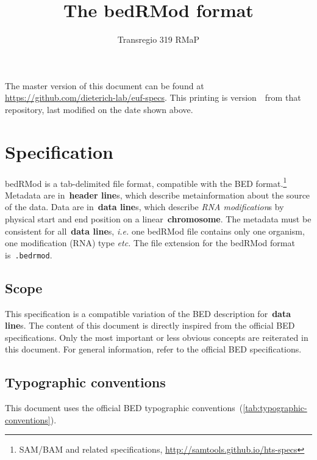 \documentclass[11pt]{article}
\title{The \acf{bedRMod} format}
\author{Transregio 319 RMaP}
\date{\headdate}
\providecommand*{\Ac}[1]{\ac{#1}} %
\begin{document}
\maketitle

\begin{small}
\noindent
The master version of this document can be found at \url{https://github.com/dieterich-lab/euf-specs}.
This printing is version~\commitdesc\ from that repository, last modified on the date shown above.
\end{small}


\section{Specification}

\Ac{bedRMod} is a tab-delimited file format, compatible with the \acf{BED} format.\footnote{SAM/BAM and related specifications, \url{http://samtools.github.io/hts-specs}} Metadata are in~\textbf{header line}s, which describe metainformation about the source of the data. Data are in~\textbf{data line}s, which describe \emph{RNA modification}s by physical start and end position on a linear~\textbf{chromosome}. The metadata must be consistent for all~\textbf{data line}s, \textit{i.e.} one \ac{bedRMod} file contains only one organism, one modification (RNA) type \textit{etc.} The file extension for the \ac{bedRMod} format is~\texttt{.bedrmod}.

\subsection{Scope}

This specification is a compatible variation of the \ac{BED} description for~\textbf{data line}s. The content of this document is directly inspired from the 
official \ac{BED} specifications. Only the most important or less obvious concepts are reiterated in this document. For general information, refer to the official \ac{BED} specifications.

\subsection{Typographic conventions}

This document uses the official \ac{BED} typographic conventions~(\autoref{tab:typographic-conventions}).
\end{document}
